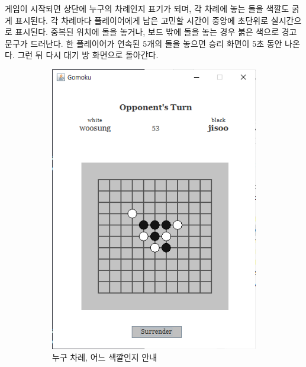 \documentclass[a4paper, 10pt]{article}
\begin{document}
게임이 시작되면 상단에 누구의 차례인지 표기가 되며, 각 차례에 놓는 돌을
색깔도 굵게 표시된다. 각 차례마다 플레이어에게 남은 고민할 시간이 중앙에
초단위로 실시간으로 표시된다. 중복된 위치에 돌을 놓거나, 보드 밖에 돌을
놓는 경우 붉은 색으로 경고 문구가 드러난다. 한 플레이어가 연속된 5개의
돌을 놓으면 승리 화면이 5초 동안 나온다. 그런 뒤 다시 대기 방 화면으로 돌아간다.
\begin{figure}[h]
  \centering
  \begin{subfigure}{.3\textwidth}
    \centering
    \includegraphics[width=.9\linewidth]{resource/game}
    \caption{누구 차례, 어느 색깔인지 안내}
    \label{fig:waiting}
  \end{subfigure}
  \begin{subfigure}{.3\textwidth}
    \centering

\end{subfigure}
\end{figure}
\end{document}
